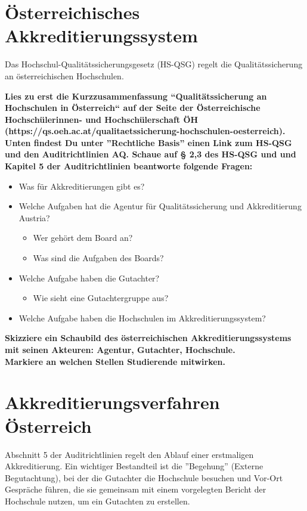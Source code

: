 \documentclass{scrartcl}
\begin{document}
\section*{Österreichisches Akkreditierungssystem}

Das Hochschul-Qualitätssicherungsgesetz (HS-QSG) regelt die Qualitätssicherung an österreichischen Hochschulen.

\vspace{1cm}

\textbf{Lies zu erst die Kurzzusammenfassung ``Qualitätssicherung an Hochschulen in Österreich`` auf der Seite der Österreichische Hochschülerinnen- und Hochschülerschaft ÖH (https://qs.oeh.ac.at/qualitaetssicherung-hochschulen-oesterreich).\\
Unten findest Du  unter ''Rechtliche  Basis'' einen Link zum HS-QSG und den Auditrichtlinien AQ. Schaue auf § 2,3 des HS-QSG und und Kapitel 5 der Auditrichtlinien beantworte folgende Fragen:}

\begin{itemize}
\item Was für Akkreditierungen gibt es?
\item Welche Aufgaben hat die Agentur für Qualitätssicherung und Akkreditierung Austria?
	\begin{itemize}
		\item Wer gehört dem Board an?
		\item Was sind die Aufgaben des Boards?
	\end{itemize}
\item Welche Aufgabe haben die Gutachter? 
	\begin{itemize}
		\item Wie sieht eine Gutachtergruppe aus?
	\end{itemize}
\item Welche Aufgabe haben die Hochschulen im Akkreditierungssystem?
\end{itemize}


\vspace{1cm}

\textbf{Skizziere ein Schaubild des österreichischen Akkreditierungssystems mit seinen Akteuren: Agentur, Gutachter, Hochschule. \\
Markiere an welchen Stellen Studierende mitwirken.}


\newpage
\section*{Akkreditierungsverfahren Österreich}
Abschnitt 5 der Auditrichtlinien regelt den Ablauf einer erstmaligen Akkreditierung. Ein wichtiger Bestandteil ist die ''Begehung'' (Externe Begutachtung), bei der die Gutachter die Hochschule besuchen und Vor-Ort Gespräche führen, die sie gemeinsam mit einem vorgelegten Bericht der Hochschule nutzen, um ein Gutachten zu erstellen.
\end{document}
